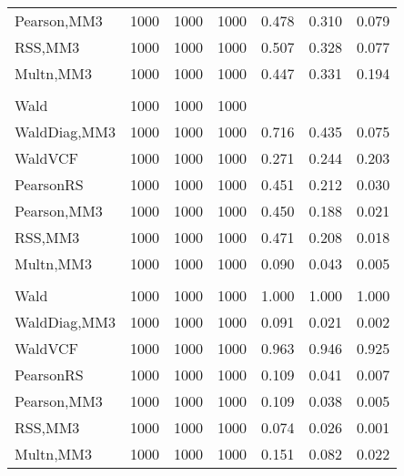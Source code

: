 \documentclass[
]{article}
\begin{document}
\begin{table}[H]
{\begin{tabular}[t]{lrrrrrr}
\hspace{1em}Pearson,MM3 & 1000 & 1000 & 1000 & 0.478 & 0.310 & 0.079\\
\hspace{1em}RSS,MM3 & 1000 & 1000 & 1000 & 0.507 & 0.328 & 0.077\\
\hspace{1em}Multn,MM3 & 1000 & 1000 & 1000 & 0.447 & 0.331 & 0.194\\
\addlinespace[0.3em]
\multicolumn{7}{l}{\textbf{1F 15V}}\\
\hspace{1em}Wald & 1000 & 1000 & 1000 &  &  \vphantom{1} & \\
\hspace{1em}WaldDiag,MM3 & 1000 & 1000 & 1000 & 0.716 & 0.435 & 0.075\\
\hspace{1em}WaldVCF & 1000 & 1000 & 1000 & 0.271 & 0.244 & 0.203\\
\hspace{1em}PearsonRS & 1000 & 1000 & 1000 & 0.451 & 0.212 & 0.030\\
\hspace{1em}Pearson,MM3 & 1000 & 1000 & 1000 & 0.450 & 0.188 & 0.021\\
\hspace{1em}RSS,MM3 & 1000 & 1000 & 1000 & 0.471 & 0.208 & 0.018\\
\hspace{1em}Multn,MM3 & 1000 & 1000 & 1000 & 0.090 & 0.043 & 0.005\\
\addlinespace[0.3em]
\multicolumn{7}{l}{\textbf{2F 10V}}\\
\hspace{1em}Wald & 1000 & 1000 & 1000 & 1.000 & 1.000 & 1.000\\
\hspace{1em}WaldDiag,MM3 & 1000 & 1000 & 1000 & 0.091 & 0.021 & 0.002\\
\hspace{1em}WaldVCF & 1000 & 1000 & 1000 & 0.963 & 0.946 & 0.925\\
\hspace{1em}PearsonRS & 1000 & 1000 & 1000 & 0.109 & 0.041 & 0.007\\
\hspace{1em}Pearson,MM3 & 1000 & 1000 & 1000 & 0.109 & 0.038 & 0.005\\
\hspace{1em}RSS,MM3 & 1000 & 1000 & 1000 & 0.074 & 0.026 & 0.001\\
\hspace{1em}Multn,MM3 & 1000 & 1000 & 1000 & 0.151 & 0.082 & 0.022\\

\end{tabular}}
\end{table}
\end{document}
